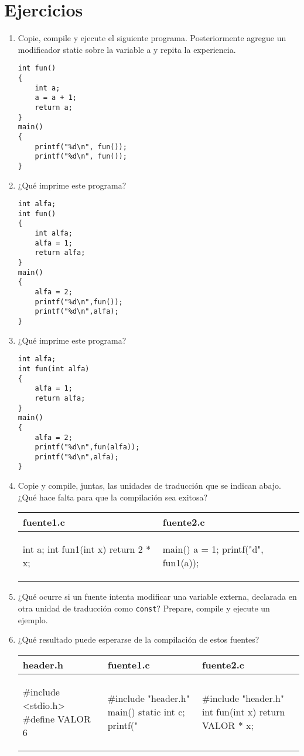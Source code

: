\section{Ejercicios}
\begin{enumerate}
	\item Copie, compile y ejecute el siguiente programa. Posteriormente agregue un modificador static sobre
la variable a y repita la experiencia.
\begin{lstlisting}
int fun()
{
	int a;
	a = a + 1;
	return a;
}
main()
{
	printf("%d\n", fun());
	printf("%d\n", fun());
}
\end{lstlisting}
\item ¿Qué imprime este programa?
\begin{lstlisting}
int alfa;
int fun()
{
	int alfa;
	alfa = 1;
	return alfa;
}
main()
{
	alfa = 2;
	printf("%d\n",fun());
	printf("%d\n",alfa);
}
\end{lstlisting}
\item ¿Qué imprime este programa?
\begin{lstlisting}
int alfa;
int fun(int alfa)
{
	alfa = 1;
	return alfa;
}
main()
{
	alfa = 2;
	printf("%d\n",fun(alfa));
	printf("%d\n",alfa);
}
\end{lstlisting}
 \item Copie y compile, juntas, las unidades de traducción que se indican abajo. ¿Qué hace falta para que
la compilación sea exitosa?

	
\begin{tabular}{p{4cm}|p{5cm}}
fuente1.c & fuente2.c\\
\hline
\begin{codecell}
int a;
int fun1(int x)
{
	return 2 * x;
}
\end{codecell}
&
\begin{codecell}
main()
{
	a = 1;
	printf("d\n", fun1(a));
}
\end{codecell}
\\
\end{tabular} 

\item ¿Qué ocurre si un fuente intenta modificar una variable externa, declarada en otra unidad de
traducción como \lstinline{const}? Prepare, compile y ejecute un ejemplo.
\item ¿Qué resultado puede esperarse de la compilación de estos fuentes?

\begin{tabular}{p{4cm}|p{5cm}|p{4cm}}
header.h & fuente1.c &fuente2.c\\
\hline
\begin{codecell}
#include <stdio.h>
#define VALOR 6
\end{codecell}
&
\begin{codecell}
#include "header.h"
main()
{
	static int c;
	printf("%
}
\end{codecell}
&
\begin{codecell}
#include "header.h"
int fun(int x)
{
	return VALOR * x;
}
\end{codecell}
\\
\end{tabular}


\end{enumerate}
